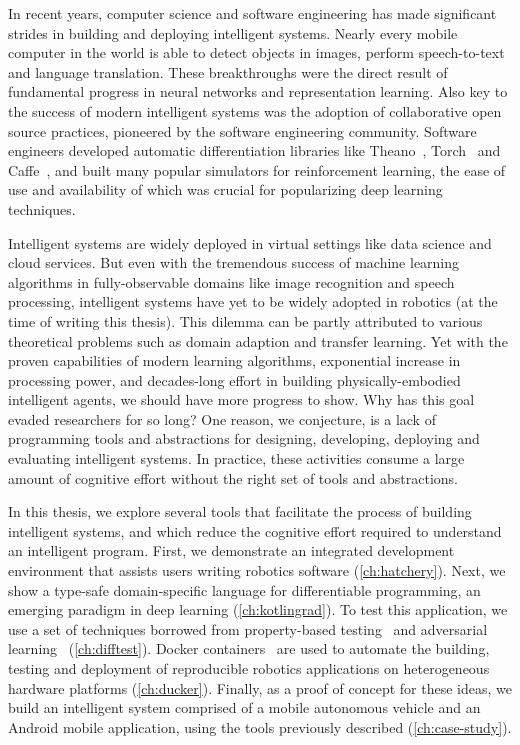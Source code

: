 \documentclass[12pt,initial,twoside,maitrise]{dms}
\numberwithin{equation}{section}
\numberwithin{table}{chapter}
\numberwithin{figure}{chapter}
\begin{document}
In recent years, computer science and software engineering has made significant strides in building and deploying intelligent systems. Nearly every mobile computer in the world is able to detect objects in images, perform speech-to-text and language translation. These breakthroughs were the direct result of fundamental progress in neural networks and representation learning. Also key to the success of modern intelligent systems was the adoption of collaborative open source practices, pioneered by the software engineering community. Software engineers developed automatic differentiation libraries like Theano~\citep{theano}, Torch~\citep{collobert2002torch} and Caffe~\citep{jia2014caffe}, and built many popular simulators for reinforcement learning, the ease of use and availability of which was crucial for popularizing deep learning techniques.

Intelligent systems are widely deployed in virtual settings like data science and cloud services. But even with the tremendous success of machine learning algorithms in fully-observable domains like image recognition and speech processing, intelligent systems have yet to be widely adopted in robotics (at the time of writing this thesis). This dilemma can be partly attributed to various theoretical problems such as domain adaption and transfer learning. Yet with the proven capabilities of modern learning algorithms, exponential increase in processing power, and decades-long effort in building physically-embodied intelligent agents, we should have more progress to show. Why has this goal evaded researchers for so long? One reason, we conjecture, is a lack of programming tools and abstractions for designing, developing, deploying and evaluating intelligent systems. In practice, these activities consume a large amount of cognitive effort without the right set of tools and abstractions.

In this thesis, we explore several tools that facilitate the process of building intelligent systems, and which reduce the cognitive effort required to understand an intelligent program. First, we demonstrate an integrated development environment that assists users writing robotics software (\autoref{ch:hatchery}). Next, we show a type-safe domain-specific language for differentiable programming, an emerging paradigm in deep learning (\autoref{ch:kotlingrad}). To test this application, we use a set of techniques borrowed from property-based testing~\citep{fink1997property} and adversarial learning~\citep{lowd2005adversarial} (\autoref{ch:difftest}). Docker containers~\citep{merkel2014docker} are used to automate the building, testing and deployment of reproducible robotics applications on heterogeneous hardware platforms (\autoref{ch:ducker}). Finally, as a proof of concept for these ideas, we build an intelligent system comprised of a mobile autonomous vehicle and an Android mobile application, using the tools previously described (\autoref{ch:case-study}).
\end{document}
